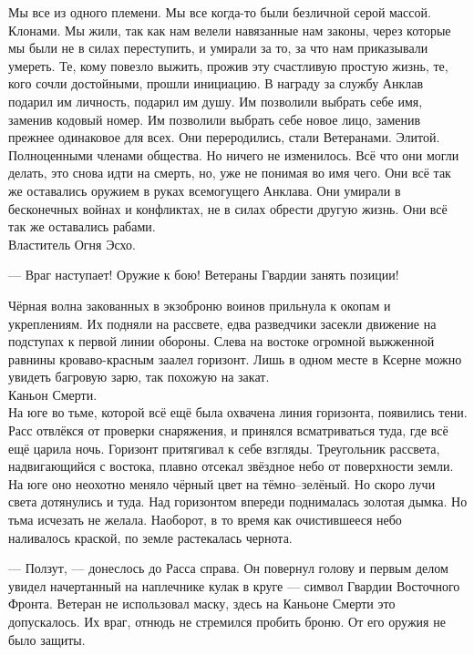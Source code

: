 \newpage

Мы все из одного племени. Мы все когда-то были безличной серой массой. Клонами. 
Мы жили, так как нам велели навязанные нам законы, через которые мы были не в 
силах переступить, и умирали за то, за что нам приказывали умереть. Те, кому 
повезло выжить, прожив эту счастливую простую жизнь, те, кого сочли достойными, 
прошли инициацию. В награду за службу Анклав подарил им личность, подарил им 
душу. Им позволили выбрать себе имя, заменив кодовый номер. Им позволили выбрать 
себе новое лицо, заменив прежнее одинаковое для всех. Они переродились, стали 
Ветеранами. Элитой.
\\

Полноценными членами общества. Но ничего не изменилось. Всё что они могли 
делать, это снова идти на смерть, но, уже не понимая во имя чего. Они всё так же 
оставались оружием в руках всемогущего Анклава. Они умирали в бесконечных войнах 
и конфликтах, не в силах обрести другую жизнь. Они всё так же оставались рабами.
\\

\noindent Властитель Огня Эсхо.

\newpage

\noindent --- Враг наступает! Оружие к бою! Ветераны Гвардии занять позиции!
    
Чёрная волна закованных в экзоброню воинов прильнула к окопам и укреплениям. 
Их подняли на рассвете, едва разведчики засекли движение на подступах к первой 
линии обороны. Слева на востоке огромной выжженной равнины кроваво-красным 
заалел горизонт. Лишь в одном месте в Ксерне можно увидеть багровую зарю, так 
похожую на закат.\\

Каньон Смерти.\\

На юге во тьме, которой всё ещё была охвачена линия горизонта, появились тени. 
Расс отвлёкся от проверки снаряжения, и принялся всматриваться туда, где всё ещё 
царила ночь. Горизонт притягивал к себе взгляды. Треугольник рассвета, 
надвигающийся с востока, плавно отсекал звёздное небо от поверхности земли. На 
юге оно неохотно меняло чёрный цвет на тёмно--зелёный. Но скоро лучи света 
дотянулись и туда. Над горизонтом впереди поднималась золотая дымка. Но тьма 
исчезать не желала. Наоборот, в то время как очистившееся небо наливалось 
краской, по земле растекалась чернота.

\noindent --- Ползут, --- донеслось до Расса справа. Он повернул голову и 
первым делом увидел начертанный на наплечнике кулак в круге --- символ Гвардии 
Восточного Фронта. Ветеран не использовал маску, здесь на Каньоне Смерти это 
допускалось. Их враг, отнюдь не стремился пробить броню. От его оружия не было 
защиты. 

